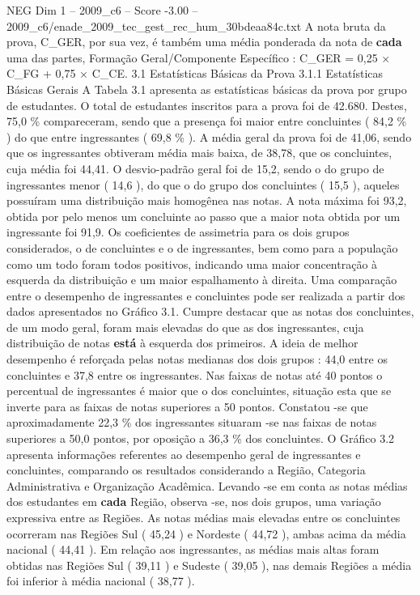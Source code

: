 \begin{textsample}{NEG Dim 1 – 2009\_c6 – Score -3.00 – 2009\_c6/enade\_2009\_tec\_gest\_rec\_hum\_30bdeaa84c.txt}
A nota bruta da prova, C\_GER, por sua vez, é também uma média ponderada da nota de \textbf{cada} uma das partes, Formação Geral/Componente Específico : C\_GER = 0,25 × C\_FG + 0,75 × C\_CE. 3.1 Estatísticas Básicas da Prova 3.1.1 Estatísticas Básicas Gerais A Tabela 3.1 apresenta as estatísticas básicas da prova por grupo de estudantes.
O total de estudantes inscritos para a prova foi de 42.680.
Destes, 75,0 \% compareceram, sendo que a presença foi maior entre concluintes ( 84,2 \% ) do que entre ingressantes ( 69,8 \% ).
A média geral da prova foi de 41,06, sendo que os ingressantes obtiveram média mais baixa, de 38,78, que os concluintes, cuja média foi 44,41.
O desvio-padrão geral foi de 15,2, sendo o do grupo de ingressantes menor ( 14,6 ), do que o do grupo dos concluintes ( 15,5 ), aqueles possuíram uma distribuição mais homogênea nas notas.
A nota máxima foi 93,2, obtida por pelo menos um concluinte ao passo que a maior nota obtida por um ingressante foi 91,9.
Os coeficientes de assimetria para os dois grupos considerados, o de concluintes e o de ingressantes, bem como para a população como um todo foram todos positivos, indicando uma maior concentração à esquerda da distribuição e um maior espalhamento à direita.
Uma comparação entre o desempenho de ingressantes e concluintes pode ser realizada a partir dos dados apresentados no Gráfico 3.1.
Cumpre destacar que as notas dos concluintes, de um modo geral, foram mais elevadas do que as dos ingressantes, cuja distribuição de notas \textbf{está} à esquerda dos primeiros.
A ideia de melhor desempenho é reforçada pelas notas medianas dos dois grupos : 44,0 entre os concluintes e 37,8 entre os ingressantes.
Nas faixas de notas até 40 pontos o percentual de ingressantes é maior que o dos concluintes, situação esta que se inverte para as faixas de notas superiores a 50 pontos.
Constatou -se que aproximadamente 22,3 \% dos ingressantes situaram -se nas faixas de notas superiores a 50,0 pontos, por oposição a 36,3 \% dos concluintes.
O Gráfico 3.2 apresenta informações referentes ao desempenho geral de ingressantes e concluintes, comparando os resultados considerando a Região, Categoria Administrativa e Organização Acadêmica.
Levando -se em conta as notas médias dos estudantes em \textbf{cada} Região, observa -se, nos dois grupos, uma variação expressiva entre as Regiões.
As notas médias mais elevadas entre os concluintes ocorreram nas Regiões Sul ( 45,24 ) e Nordeste ( 44,72 ), ambas acima da média nacional ( 44,41 ).
Em relação aos ingressantes, as médias mais altas foram obtidas nas Regiões Sul ( 39,11 ) e Sudeste ( 39,05 ), nas demais Regiões a média foi inferior à média nacional ( 38,77 ).

\end{textsample}
